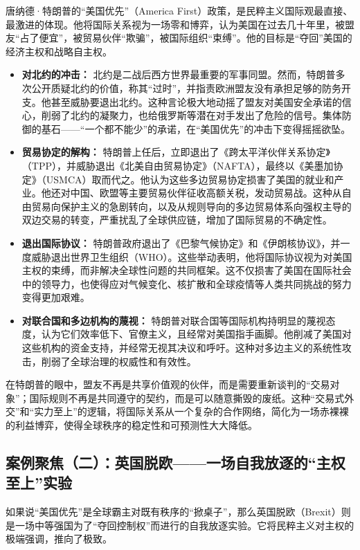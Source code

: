 唐纳德·特朗普的“美国优先”（America First）政策，是民粹主义国际观最直接、最激进的体现。他将国际关系视为一场零和博弈，认为美国在过去几十年里，被盟友“占了便宜”，被贸易伙伴“欺骗”，被国际组织“束缚”。他的目标是“夺回”美国的经济主权和战略自主权。

\begin{itemize}
    \item \textbf{对北约的冲击：} 北约是二战后西方世界最重要的军事同盟。然而，特朗普多次公开质疑北约的价值，称其“过时”，并指责欧洲盟友没有承担足够的防务开支。他甚至威胁要退出北约。这种言论极大地动摇了盟友对美国安全承诺的信心，削弱了北约的凝聚力，也给俄罗斯等潜在对手发出了危险的信号。集体防御的基石——“一个都不能少”的承诺，在“美国优先”的冲击下变得摇摇欲坠。
    \item \textbf{贸易协定的解构：} 特朗普上任后，立即退出了《跨太平洋伙伴关系协定》（TPP），并威胁退出《北美自由贸易协定》（NAFTA），最终以《美墨加协定》（USMCA）取而代之。他认为这些多边贸易协定损害了美国的就业和产业。他还对中国、欧盟等主要贸易伙伴征收高额关税，发动贸易战。这种从自由贸易向保护主义的急剧转向，以及从规则导向的多边贸易体系向强权主导的双边交易的转变，严重扰乱了全球供应链，增加了国际贸易的不确定性。
    \item \textbf{退出国际协议：} 特朗普政府退出了《巴黎气候协定》和《伊朗核协议》，并一度威胁退出世界卫生组织（WHO）。这些举动表明，他将国际协议视为对美国主权的束缚，而非解决全球性问题的共同框架。这不仅损害了美国在国际社会中的领导力，也使得应对气候变化、核扩散和全球疫情等人类共同挑战的努力变得更加艰难。
    \item \textbf{对联合国和多边机构的蔑视：} 特朗普对联合国等国际机构持明显的蔑视态度，认为它们效率低下、官僚主义，且经常对美国指手画脚。他削减了美国对这些机构的资金支持，并经常无视其决议和呼吁。这种对多边主义的系统性攻击，削弱了全球治理的权威性和有效性。
\end{itemize}

在特朗普的眼中，盟友不再是共享价值观的伙伴，而是需要重新谈判的“交易对象”；国际规则不再是共同遵守的契约，而是可以随意撕毁的废纸。这种“交易式外交”和“实力至上”的逻辑，将国际关系从一个复杂的合作网络，简化为一场赤裸裸的利益博弈，使得全球秩序的稳定性和可预测性大大降低。

\subsection{案例聚焦（二）：英国脱欧——一场自我放逐的“主权至上”实验}

如果说“美国优先”是全球霸主对既有秩序的“掀桌子”，那么英国脱欧（Brexit）则是一场中等强国为了“夺回控制权”而进行的自我放逐实验。它将民粹主义对主权的极端强调，推向了极致。

